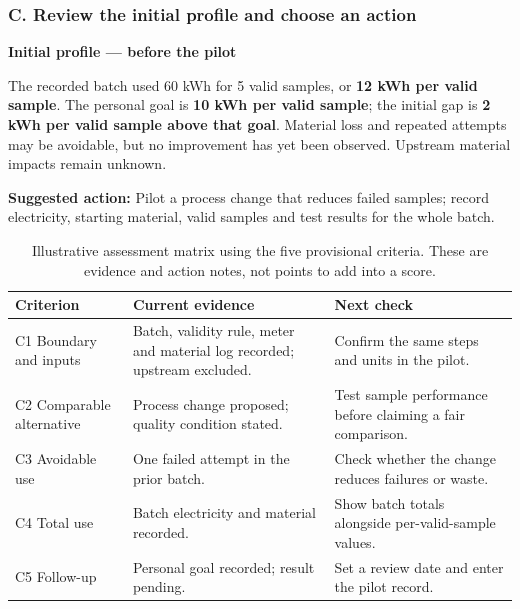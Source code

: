 \subsubsection*{C. Review the initial profile and choose an action}
\begin{assessscreen}
\textbf{Initial profile --- before the pilot}\par
The recorded batch used 60 kWh for 5 valid samples, or \textbf{12 kWh per valid sample}. The personal goal is \textbf{10 kWh per valid sample}; the initial gap is \textbf{2 kWh per valid sample above that goal}. Material loss and repeated attempts may be avoidable, but no improvement has yet been observed. Upstream material impacts remain unknown.\par\medskip
\textbf{Suggested action:} Pilot a process change that reduces failed samples; record electricity, starting material, valid samples and test results for the whole batch.\par\medskip
{}\quad
{}\quad
{}\quad
{}
\end{assessscreen}

\begin{table}[H]
\centering\small
\begin{tabularx}{\textwidth}{@{}>{\raggedright\arraybackslash}p{}>{\raggedright\arraybackslash}p{}X@{}}
\toprule
Criterion & Current evidence & Next check \\
\midrule
C1 Boundary and inputs & Batch, validity rule, meter and material log recorded; upstream excluded. & Confirm the same steps and units in the pilot. \\
C2 Comparable alternative & Process change proposed; quality condition stated. & Test sample performance before claiming a fair comparison. \\
C3 Avoidable use & One failed attempt in the prior batch. & Check whether the change reduces failures or waste. \\
C4 Total use & Batch electricity and material recorded. & Show batch totals alongside per-valid-sample values. \\
C5 Follow-up & Personal goal recorded; result pending. & Set a review date and enter the pilot record. \\
\bottomrule
\end{tabularx}
\caption{Illustrative assessment matrix using the five provisional criteria. These are evidence and action notes, not points to add into a score.}
\label{tab:assess-criteria-screen}
\end{table}


